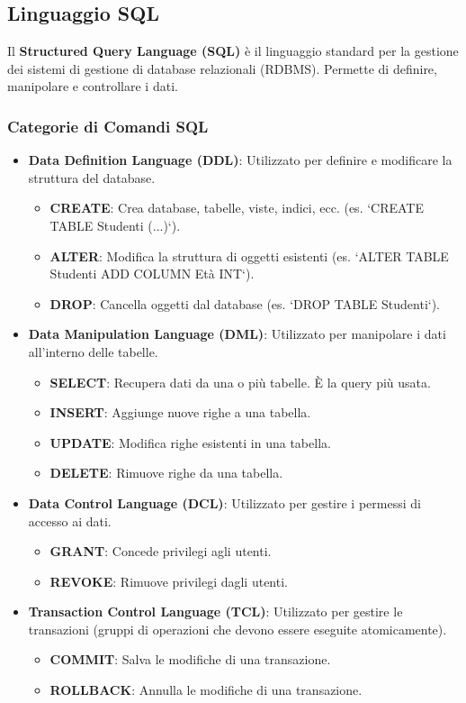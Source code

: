 \subsection{Linguaggio SQL}
Il \textbf{Structured Query Language (SQL)} è il linguaggio standard per la gestione dei sistemi di gestione di database relazionali (RDBMS). Permette di definire, manipolare e controllare i dati.

\subsubsection{Categorie di Comandi SQL}
\begin{itemize}
    \item \textbf{Data Definition Language (DDL)}: Utilizzato per definire e modificare la struttura del database.
    \begin{itemize}
        \item \textbf{CREATE}: Crea database, tabelle, viste, indici, ecc. (es. `CREATE TABLE Studenti (...)`).
        \item \textbf{ALTER}: Modifica la struttura di oggetti esistenti (es. `ALTER TABLE Studenti ADD COLUMN Età INT`).
        \item \textbf{DROP}: Cancella oggetti dal database (es. `DROP TABLE Studenti`).
    \end{itemize}
    \item \textbf{Data Manipulation Language (DML)}: Utilizzato per manipolare i dati all'interno delle tabelle.
    \begin{itemize}
        \item \textbf{SELECT}: Recupera dati da una o più tabelle. È la query più usata.
        \item \textbf{INSERT}: Aggiunge nuove righe a una tabella.
        \item \textbf{UPDATE}: Modifica righe esistenti in una tabella.
        \item \textbf{DELETE}: Rimuove righe da una tabella.
    \end{itemize}
    \item \textbf{Data Control Language (DCL)}: Utilizzato per gestire i permessi di accesso ai dati.
    \begin{itemize}
        \item \textbf{GRANT}: Concede privilegi agli utenti.
        \item \textbf{REVOKE}: Rimuove privilegi dagli utenti.
    \end{itemize}
    \item \textbf{Transaction Control Language (TCL)}: Utilizzato per gestire le transazioni (gruppi di operazioni che devono essere eseguite atomicamente).
    \begin{itemize}
        \item \textbf{COMMIT}: Salva le modifiche di una transazione.
        \item \textbf{ROLLBACK}: Annulla le modifiche di una transazione.
    \end{itemize}
\end{itemize}


